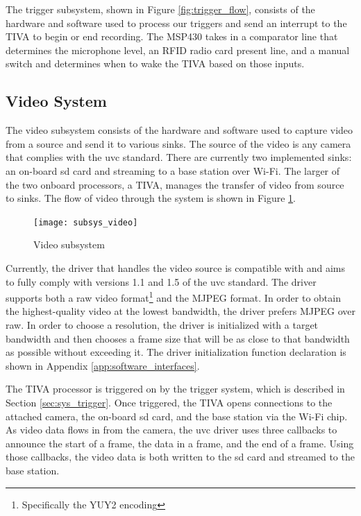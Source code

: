 \documentclass[12pt]{article}
\begin{document}
The trigger subsystem, shown in Figure \ref{fig:trigger_flow}, consists of the
hardware and software used to process our triggers and send an interrupt to the
TIVA to begin or end recording. The MSP430 takes in a comparator line that
determines the microphone level, an RFID radio card present line, and a manual
switch and determines when to wake the TIVA based on those inputs.

\subsection{Video System}
\label{sec:sys_video}
The video subsystem consists of the hardware and software used to capture video
from a source and send it to various sinks. The source of the video is any
camera that complies with the \gls{uvc} standard. There are currently two
implemented sinks: an on-board \gls{sd} card and streaming to a base station
over Wi-Fi. The larger of the two onboard processors, a TIVA, manages the
transfer of video from source to sinks. The flow of video through the system is
shown in Figure \ref{fig:video_flow}.

\begin{figure}[h]
    \centering
    \texttt{[image: subsys\_video]}
    \caption{Video subsystem}
    \label{fig:video_flow}
\end{figure}

Currently, the driver that handles the video source is compatible with and aims
to fully comply with versions 1.1 and 1.5 of the \gls{uvc}
standard\cite{uvc_standard_11,uvc_standard_15}. The driver supports both a raw
video format\footnote{Specifically the YUY2 encoding} and the MJPEG format. In
order to obtain the highest-quality video at the lowest bandwidth, the driver
prefers MJPEG over raw. In order to choose a resolution, the driver is
initialized with a target bandwidth and then chooses a frame size that will be
as close to that bandwidth as possible without exceeding it. The driver
initialization function declaration is shown in Appendix
\ref{app:software_interfaces}.

The TIVA processor is triggered on by the trigger system, which is described in
Section \ref{sec:sys_trigger}. Once triggered, the TIVA opens connections to
the attached camera, the on-board \gls{sd} card, and the base station via the
Wi-Fi chip. As video data flows in from the camera, the \gls{uvc} driver uses
three callbacks to announce the start of a frame, the data in a frame, and the
end of a frame. Using those callbacks, the video data is both written to the
\gls{sd} card and streamed to the base station.
\end{document}
